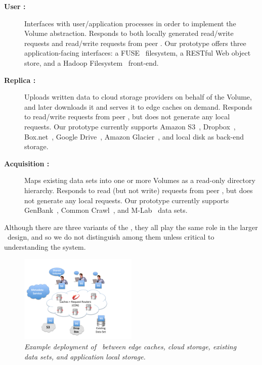 \begin{description}

\item[\bf User \SG:] Interfaces with user/application processes in
  order to implement the Volume abstraction.  Responds to both locally
  generated read/write requests and read/write requests from peer \SGs.  Our
  prototype offers three application-facing interfaces: a
  FUSE~\cite{fuse} filesystem, a RESTful Web
  object store, and a Hadoop Filesystem~\cite{hdfs} front-end.

\item[\bf Replica \SG:] Uploads written data to cloud storage
  providers on behalf of the Volume, and later downloads it and serves
  it to edge caches on demand.  Responds to read/write requests from peer
  \SGs, but does not generate any local requests. Our prototype
  currently supports Amazon S3~\cite{aws-overview}, Dropbox~\cite{dropbox},
  Box.net~\cite{Box.net}, Google Drive~\cite{google-drive}, Amazon
  Glacier~\cite{aws-overview}, and local disk as back-end storage.

\item[\bf Acquisition \SG:] Maps existing data sets
  into one or more Volumes as a read-only directory hierarchy.
  Responds to read (but not write) requests from peer \SGs, but does not
  generate any local requests. Our prototype currently supports
  GenBank~\cite{GenBank}, Common Crawl~\cite{common-crawl}, and M-Lab~\cite{mlab} data sets.

\end{description}

\noindent Although there are three variants of the \SG, they all play
the same role in the larger \Syndicate\ design, and so we do not
distinguish among them unless critical to understanding the system.

\begin{figure}[h!]
\centering
\includegraphics[width=0.5\textwidth]{figures/Syndicate-fig}
\caption{\it Example deployment of \SGs\ between edge caches, cloud storage, existing data sets, and application local storage.}
\label{fig:deployment}
\end{figure}

